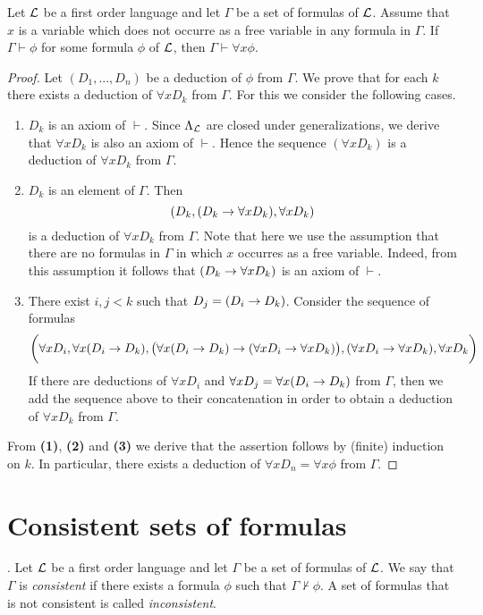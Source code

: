 \begin{theorem}\label{theorem:generalization_rule}
Let ${\mathcal L}$ be a first order language and let $\Gamma$ be a set of formulas of ${\mathcal L}$. Assume that $x$ is a variable which does not occurre as a free variable in any formula in $\Gamma$. If $\Gamma \vdash \phi$ for some formula $\phi$ of ${\mathcal L}$, then $\Gamma \vdash \forall x\phi$.
\end{theorem}
\begin{proof}
Let $(D_1,...,D_n)$ be a deduction of $\phi$ from $\Gamma$. We prove that for each $k$ there exists a deduction of $\forall xD_k$ from $\Gamma$. For this we consider the following cases.
\begin{enumerate}[label=\textbf{(\arabic*)}, leftmargin=3.0em]
\item $D_k$ is an axiom of $\vdash$. Since $\Lambda_{{\mathcal L}}$ are closed under generalizations, we derive that $\forall xD_k$ is also an axiom of $\vdash$. Hence the sequence $(\forall xD_k)$ is a deduction of $\forall x D_k$ from $\Gamma$.
\item $D_k$ is an element of $\Gamma$. Then
$$(D_k,(D_k \rightarrow \forall x D_k),\forall x D_k)$$
is a deduction of $\forall xD_k$ from $\Gamma$. Note that here we use the assumption that there are no formulas in $\Gamma$ in which $x$ occurres as a free variable. Indeed, from this assumption it follows that $(D_k \rightarrow \forall xD_k)$ is an axiom of $\vdash$.
\item There exist $i, j < k$ such that $D_j = (D_i \rightarrow D_k)$. Consider the sequence of formulas
$$\bigg(\forall xD_i , \forall x (D_i \rightarrow D_k ) , \big(\forall x (D_i \rightarrow D_k ) \rightarrow (\forall xD_i \rightarrow \forall xD_k)\big) , (\forall xD_i \rightarrow \forall xD_k) , \forall xD_k\bigg)$$
If there are deductions of $\forall x D_i$ and $\forall xD_j = \forall x (D_i \rightarrow D_k)$ from $\Gamma$, then we add the sequence above to their concatenation in order to obtain a deduction of $\forall x D_k$ from $\Gamma$.
\end{enumerate}
From \textbf{(1)}, \textbf{(2)} and \textbf{(3)} we derive that the assertion follows by (finite) induction on $k$. In particular, there exists a deduction of $\forall x D_n = \forall x \phi$ from $\Gamma$.
\end{proof}

\section{Consistent sets of formulas}

\begin{definition}.
Let ${\mathcal L}$ be a first order language and let $\Gamma$ be a set of formulas of ${\mathcal L}$. We say that $\Gamma$ is \textit{consistent} if there exists a formula $\phi$ such that $\Gamma \nvdash \phi$. A set of formulas that is not consistent is called \textit{inconsistent}.
\end{definition}

